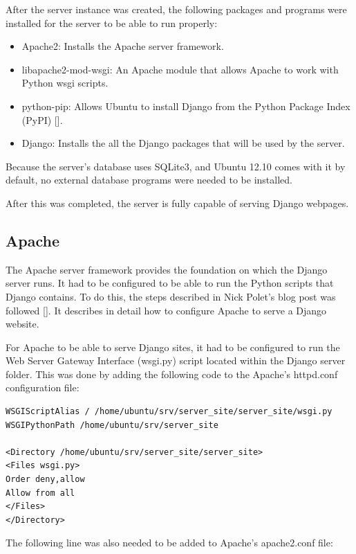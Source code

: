 After the server instance was created, the following packages and programs were installed for
the server to be able to run properly:

\begin{itemize}
  \item Apache2: Installs the Apache server framework.
  \item libapache2-mod-wsgi: An Apache module that allows Apache to work with Python wsgi
  scripts.
  \item python-pip: Allows Ubuntu to install Django from the Python Package Index (PyPI)
  [\cite{website:pypi}].
  \item Django: Installs the all the Django packages that will be used by the server. 
\end{itemize}

Because the server's database uses SQLite3, and Ubuntu 12.10 comes with it by default, no
external database programs were needed to be installed. 

After this was completed, the server is fully capable of serving Django webpages. 

\subsection{Apache}

The Apache server framework provides the foundation on which the Django server runs. It had to
be configured to be able to run the Python scripts that Django contains. To do this, the steps
described in Nick Polet's blog post was followed [\cite{article:apache-setup}]. It describes
in detail how to configure Apache to serve a Django website.

For Apache to be able to serve Django sites, it had to be configured to run the Web Server
Gateway Interface (wsgi.py) script located within the Django server folder. This was done by
adding the following code to the Apache's httpd.conf configuration file:

\begin{verbatim}
WSGIScriptAlias / /home/ubuntu/srv/server_site/server_site/wsgi.py
WSGIPythonPath /home/ubuntu/srv/server_site

<Directory /home/ubuntu/srv/server_site/server_site>
<Files wsgi.py>
Order deny,allow
Allow from all
</Files>
</Directory>
\end{verbatim}

The following line was also needed to be added to Apache's apache2.conf file:

